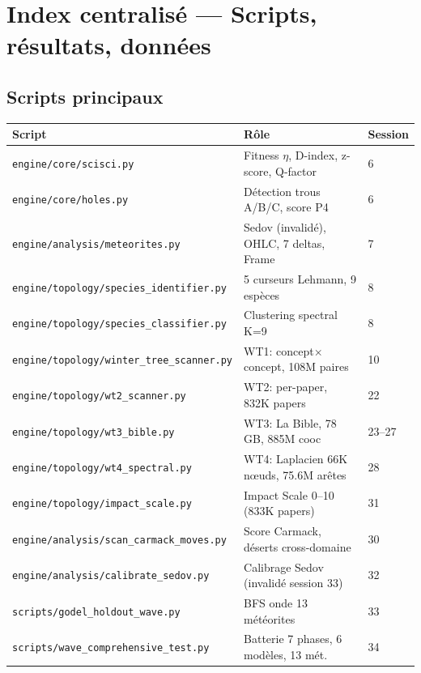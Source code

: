 \documentclass[11pt,a4paper]{article}
\begin{document}
\section{Index centralis\'e --- Scripts, r\'esultats, donn\'ees}

\subsection{Scripts principaux}

\begin{center}
\begin{tabular}{lll}
\toprule
\textbf{Script} & \textbf{R\^ole} & \textbf{Session} \\
\midrule
\texttt{engine/core/scisci.py} & Fitness $\eta$, D-index, z-score, Q-factor & 6 \\
\texttt{engine/core/holes.py} & D\'etection trous A/B/C, score P4 & 6 \\
\texttt{engine/analysis/meteorites.py} & Sedov (invalid\'e), OHLC, 7 deltas, Frame & 7 \\
\texttt{engine/topology/species\_identifier.py} & 5 curseurs Lehmann, 9 esp\`eces & 8 \\
\texttt{engine/topology/species\_classifier.py} & Clustering spectral K=9 & 8 \\
\texttt{engine/topology/winter\_tree\_scanner.py} & WT1: concept$\times$concept, 108M paires & 10 \\
\texttt{engine/topology/wt2\_scanner.py} & WT2: per-paper, 832K papers & 22 \\
\texttt{engine/topology/wt3\_bible.py} & WT3: La Bible, 78 GB, 885M cooc & 23--27 \\
\texttt{engine/topology/wt4\_spectral.py} & WT4: Laplacien 66K n\oe uds, 75.6M ar\^etes & 28 \\
\texttt{engine/topology/impact\_scale.py} & Impact Scale 0--10 (833K papers) & 31 \\
\texttt{engine/analysis/scan\_carmack\_moves.py} & Score Carmack, d\'eserts cross-domaine & 30 \\
\texttt{engine/analysis/calibrate\_sedov.py} & Calibrage Sedov (invalid\'e session 33) & 32 \\
\texttt{scripts/godel\_holdout\_wave.py} & BFS onde 13 m\'et\'eorites & 33 \\
\texttt{scripts/wave\_comprehensive\_test.py} & Batterie 7 phases, 6 mod\`eles, 13 m\'et. & 34 \\

\end{tabular}
\end{center}
\end{document}
